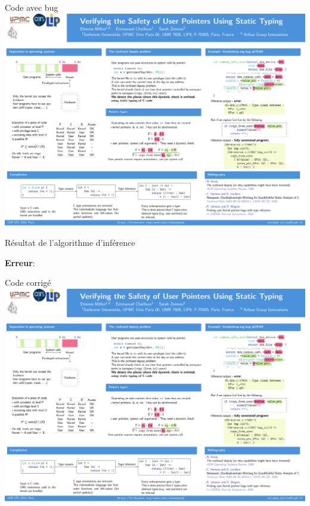 \documentclass{beamer}
\def\codeout#1{
    \begin{center}
    \fboxsep=2mm
    \colorbox{codeoutcol}{\BUseVerbatim{#1}}
    \end{center}
}
\begin{document}
\begin{frame}{Code avec bug}
    \includegraphics[trim=2300 1430 100 500,clip,width=\textwidth]{poster.pdf}
\end{frame}

\begin{frame}[fragile]{Résultat de l'algorithme d'inférence}

\textbf{Erreur}:

\codeout{drmko}
\end{frame}

\begin{frame}{Code corrigé}
    \includegraphics[trim=2300 990 100 1220,clip,width=\textwidth]{poster.pdf}
\end{frame}
\end{document}
